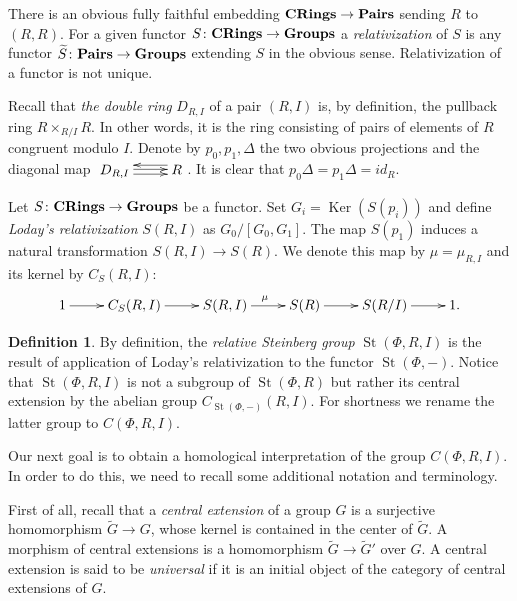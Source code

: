 \documentclass[oneside, 8pt]{amsart}
\theoremstyle{remark}
\theoremstyle{definition}
\numberwithin{lemma}{section}
\numberwithin{prop}{section}
\numberwithin{corollary}{section}
\numberwithin{externaltheorem}{section}
\newtheorem{df}[lemma]{Definition} \Crefname{df}{Definition}{Definitions}
\DeclareMathOperator{\Ker}{Ker}
\DeclareMathOperator{\St}{St}
\newcommand{\catname}[1]{{\normalfont\textbf{#1}}} %
\numberwithin{equation}{section}
\begin{document}
There is an obvious fully faithful embedding $\catname{CRings} \to \catname{Pairs}$ sending $R$ to $(R, R)$. For a given functor $S \colon \catname{CRings} \to \catname{Groups}$ a {\it relativization} of $S$ is any functor $\widetilde{S} \colon \catname{Pairs} \to \catname{Groups}$ extending $S$ in the obvious sense. Relativization of a functor is not unique.

Recall that {\it the double ring} $D_{R, I}$ of a pair $(R, I)$ is, by definition, the pullback ring $R \times_{R/I} R$. In other words, it is the ring consisting of pairs of elements of $R$ congruent modulo $I$. Denote by $p_0, p_1, \Delta$ the two obvious projections and the diagonal map $\xymatrix{D_{R,I} \ar@<1pt>[r] \ar@<-2.5pt>[r] & \ar@<-4pt>[l] R}$. It is clear that $p_0 \Delta = p_1 \Delta = id_{R}$.

Let $S \colon \catname{CRings} \to \catname{Groups}$ be a functor. Set $G_i = \Ker(S(p_i))$ and define {\it Loday's relativization} $S(R, I)$ as $ G_0 / [G_0, G_1]$. The map $S(p_1)$ induces a natural transformation $S(R, I) \to S(R)$. We denote this map by $\mu = \mu_{R,I}$ and its kernel by $C_S(R, I)$: \begin{equation} \label{LodayRelativization} \xymatrix{ 1 \ar[r] & C_S(R, I) \ar[r] & S(R, I) \ar^{\mu}[r] & S(R) \ar[r] & S(R/I) \ar[r] & 1.} \end{equation}

\begin{df} By definition, the {\it relative Steinberg group} $\St(\Phi, R, I)$ is the result of application of Loday's relativization to the functor $\St(\Phi, -)$. Notice that $\St(\Phi, R, I)$ is not a subgroup of $\St(\Phi, R)$ but rather its central extension by the abelian group $C_{\St(\Phi, -)}(R, I)$. For shortness we rename the latter group to $C(\Phi, R, I)$. \end{df}

Our next goal is to obtain a homological interpretation of the group $C(\Phi, R, I)$.
In order to do this, we need to recall some additional notation and terminology.

First of all, recall that a {\it central extension} of a group $G$ is a surjective homomorphism $\widetilde{G} \to G$, whose kernel is contained in the center of $\widetilde{G}$. 
A morphism of central extensions is a homomorphism $\widetilde{G} \to \widetilde{G}'$ over $G$.
A central extension is said to be {\it universal} if it is an initial object of the category of central extensions of $G$.
\end{document}

